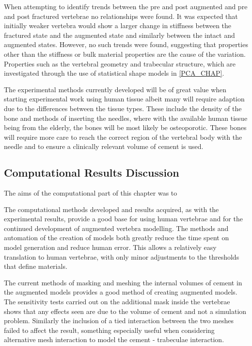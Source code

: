 When attempting to identify trends between the pre and post augmented and pre
and post fractured vertebrae no relationships were found.  It was expected that
initially weaker vertebra would show a larger change in stiffness between the
fractured state and the augmented state and similarly between the intact and
augmented states.  However, no such trends were found, suggesting that
properties other than the stiffness or bulk material properties are the cause
of the variation.  Properties such as the vertebral geometry and trabecular
structure, which are investigated through the use of statistical shape models
in \cref{PCA_CHAP}.

The experimental methods currently developed will be of great value when
starting experimental work using human tissue albeit many will require adaption
due to the differences between the tissue types.  These include the density of
the bone and methods of inserting the needles, where with the available human
tissue being from the elderly, the bones will be most likely be osteoporotic.
These bones will require more care to reach the correct region of the vertebral
body with the needle and to ensure a clinically relevant volume of cement is
used.



\subsection{Computational Results Discussion}

The aims of the computational part of this chapter was to 


The computational methods developed and results acquired, as with the
experimental results, provide a good base for using human vertebrae and for the
continued development of augmented vertebra modelling. The methods and
automation of the creation of models both greatly reduce the time spent on
model generation and reduce human error. This allows a relatively easy
translation to human vertebrae, with only minor adjustments to the thresholds
that define materials.

The current methods of masking and meshing the internal volumes of cement in
the augmented models provides a good method of creating augmented models. The
sensitivity tests carried out on the additional mask inside the vertebrae shows
that any effects seen are due to the volume of cement and not a simulation
problem. Similarly the inclusion of a tied interaction between the two meshes
failed to affect the result, something especially useful when considering
alternative mesh interaction to model the cement - trabeculae interaction.

